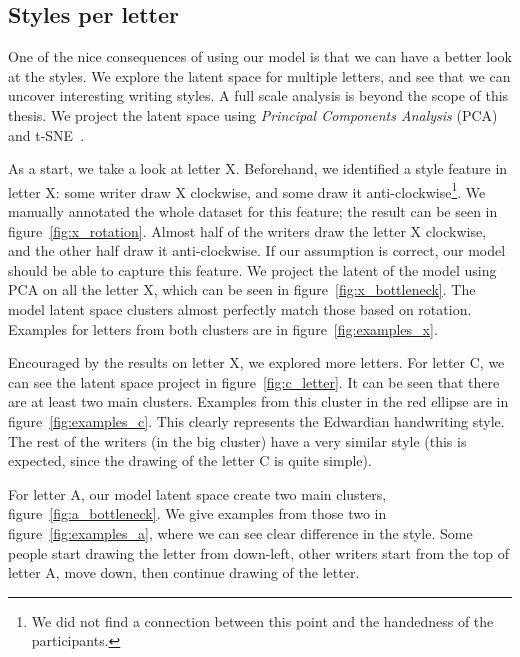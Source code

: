   \subsection{Styles per letter} \label{ch:framework_sec:styleperletter}
  \par One of the nice consequences of using our model is that we can have a better look at the styles. We explore the latent space for multiple letters, and see that we can uncover interesting writing styles. A full scale analysis is beyond the scope of this thesis. We project the latent space using \textit{Principal Components Analysis} (PCA)~\citep{jolliffe2011principal} and t-SNE~\citep{maaten2008visualizing}.

  \par As a start, we take a look at letter X. Beforehand, we identified a style feature in letter X: some writer draw X clockwise, and some draw it anti-clockwise\footnote{We did not find a connection between this point and the handedness of the participants.}. We manually annotated the whole dataset for this feature; the result can be seen in figure~\ref{fig:x_rotation}. Almost half of the writers draw the letter X clockwise, and the other half draw it anti-clockwise. If our assumption is correct, our model should be able to capture this feature. We project the latent  of the model using PCA on all the letter X, which can be seen in figure~\ref{fig:x_bottleneck}. The model latent space clusters almost perfectly match those based on rotation. Examples for letters from both clusters are in figure~\ref{fig:examples_x}.

  \par Encouraged by the results on letter X, we explored more letters. For letter C, we can see the latent space project in figure~\ref{fig:c_letter}. It can be seen that there are at least two main clusters. Examples from this cluster in the red ellipse are in figure~\ref{fig:examples_c}. This clearly represents the Edwardian handwriting style. The rest of the writers (in the big cluster) have a very similar style (this is expected, since the drawing of the letter C is quite simple).

  \par For letter A, our model latent space create two main clusters, figure~\ref{fig:a_bottleneck}. We give examples from those two in figure~\ref{fig:examples_a}, where we can see clear difference in the style. Some people start drawing the letter from down-left, other writers start from the top of letter A, move down, then continue drawing of the letter.


